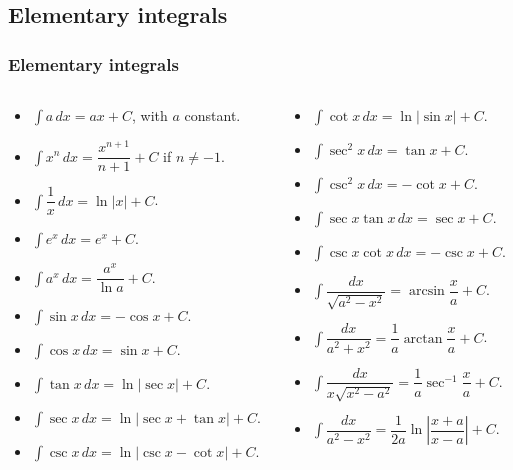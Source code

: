 \subsection{Elementary integrals}
\begin{frame}
\frametitle{Elementary integrals}
\begin{columns}
\begin{column}{0.5\textwidth}
\begin{itemize}
\item $\int a\,dx=ax+C$, with $a$ constant.
\item $\int x^n\,dx=\dfrac{x^{n+1}}{n+1}+C$ \quad if $n\neq -1$.
\item $\int \dfrac{1}{x}\, dx=\ln|x|+C$.
\item $\int e^x\,dx=e^x+C$.
\item $\int a^x\,dx=\dfrac{a^x}{\ln a}+C$.
\item $\int \sin x\, dx=-\cos x+C$.
\item $\int \cos x\, dx=\sin x+C$.
\item $\int \tan x\, dx=\ln|\sec x|+C$.
\item $\int \sec x\, dx = \ln|\sec x + \tan x|+C$.
\item $\int \csc x\, dx= \ln|\csc x-\cot x|+C$.
\end{itemize}
\end{column}
\begin{column}{0.5\textwidth}
\begin{itemize}
\item $\int \cot x \, dx= \ln|\sin x|+C$.
\item $\int \sec^2 x\, dx= \tan x+ C$.
\item $\int \csc^2 x\, dx= -\cot x+ C$.
\item $\int \sec x \tan x\, dx= \sec x+ C$.
\item $\int \csc x \cot x\, dx = -\csc x +C$.
\item $\int \dfrac{dx}{\sqrt{a^2-x^2}}=\arcsin\dfrac{x}{a}+C$.
\item $\int \dfrac{dx}{a^2+x^2}=\dfrac{1}{a}\arctan\dfrac{x}{a}+C$.
\item $\int \dfrac{dx}{x\sqrt{x^2-a^2}}=\dfrac{1}{a}\sec^{-1}\dfrac{x}{a}+C$.
\item $\int \dfrac{dx}{a^2-x^2}=\dfrac{1}{2a}\ln\left|\dfrac{x+a}{x-a}\right|+C$.
\end{itemize}
\end{column}
\end{columns}
\end{frame}


